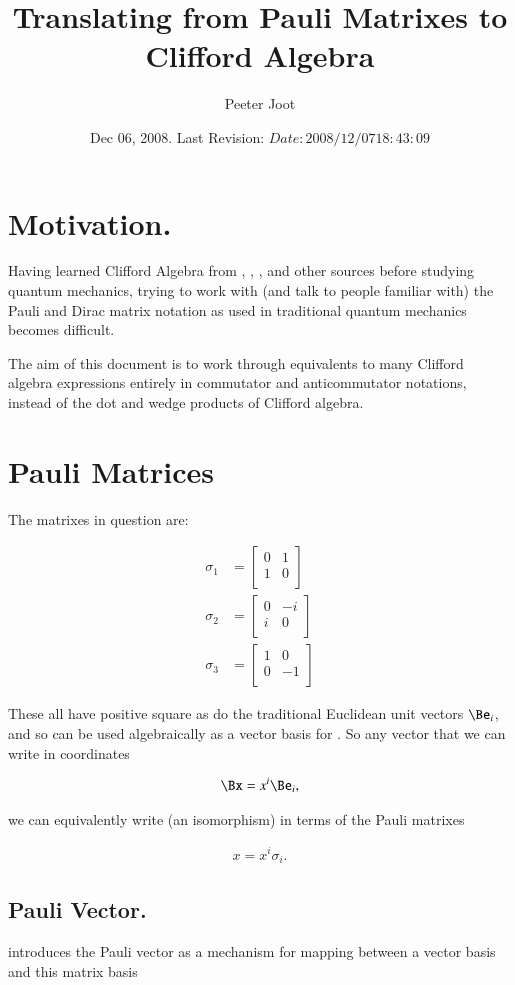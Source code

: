 \documentclass{article}
\title{Translating from Pauli Matrixes to Clifford Algebra}
\author{Peeter Joot}
\date{ Dec 06, 2008.  Last Revision: $Date: 2008/12/07 18:43:09 $ }
\newcommand{\PauliX}[0]{
\begin{bmatrix}
0 & 1 \\
1 & 0 \\
\end{bmatrix}
}
\newcommand{\PauliY}[0]{
\begin{bmatrix}
0 & -i \\
i & 0 \\
\end{bmatrix}
}
\newcommand{\PauliZ}[0]{
\begin{bmatrix}
1 & 0 \\
0 & -1 \\
\end{bmatrix}
}
\begin{document}
\maketitle{}

\tableofcontents

\section{ Motivation. }

Having learned Clifford Algebra from 
\cite{doran2003gap}, \cite{hestenes1999nfc}, \cite{dorst2007gac}, and other sources
before studying quantum mechanics, trying to work with (and talk to people familiar with) the Pauli and Dirac matrix notation as used in
traditional quantum mechanics becomes difficult.

The aim of this document is to work through equivalents to many Clifford algebra expressions entirely in
commutator and anticommutator notations, instead of the dot and wedge products of Clifford algebra.

\section{ Pauli Matrices }

The matrixes in question are:

\begin{align}
\sigma_1 &= \PauliX \\
\sigma_2 &= \PauliY \\
\sigma_3 &= \PauliZ
\end{align}

These all have positive square as do the traditional Euclidean unit vectors $\Be_i$, and so can be used algebraically as a vector basis for .  So any vector that we
can write in coordinates

\begin{align*}
\Bx = x^i \Be_i,
\end{align*}

we can equivalently write (an isomorphism) in terms of the Pauli matrixes

\begin{align}\label{eqn:vectorInPauliBasis}
x = x^i \sigma_i.
\end{align}

\subsection{ Pauli Vector. }
\cite{wikipauli} introduces the Pauli vector as a mechanism for mapping between a vector basis and this matrix basis
\end{document}
